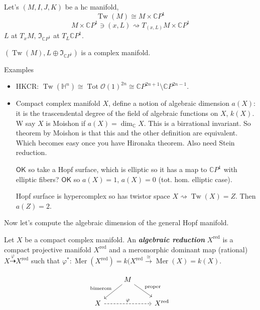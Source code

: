  \begin{defn}\leavevmode
	Let's $(M,I,J,K)$ be a hc manifold,
\[\operatorname{Tw}(M)\cong M\times \mathbb{C}P^{1}\]
\[M\times \mathbb{C}P^{1} \ni(x,L)\rightsquigarrow T_{(x,L)}M\times \mathbb{C}P^{1}\]
$L$ at  $T_xM$,  $\mathfrak{I}_{\mathbb{C}P^{1}}$ at $T_L\mathbb{C}P^{1}$.
\end{defn}


\begin{thm}\leavevmode
	$(\operatorname{Tw}(M),L\oplus \mathfrak{I}_{\mathbb{C}P^{1}})$ is a complex manifold.
\end{thm}

\begin{thing5}{Examples}\leavevmode
	\begin{itemize}
		\item HKCR: $\operatorname{Tw}(\mathbb{H}^n)\cong \operatorname{Tot}\mathcal{O}(1)^{2n}\cong \mathbb{C}P^{2n+1}\setminus \mathbb{C}P^{2n-1}$.
		\item Compact complex manifold $X$, define a notion of algebraic dimension $a(X)$: it is the trascendental degree of the field of algebraic functions on $X$,  $k(X)$. W say  $X$ is Moishon if $a(X)=\dim_\mathbb{C}X$. This is a birrational invariant. So theorem by Moishon is that this and the other definition are equivalent. Which  becomes easy once you have Hironaka theorem. Also need Stein reduction.

			$\mathsf{OK}$ so take a Hopf surface, which is elliptic so it has a map to $\mathbb{C}P^{1}$ with elliptic fibers? $\mathsf{OK}$ so $a(X)=1$,  $a(X)=0$ (tot. hom. elliptic case).

			\begin{thm}[Pontecorro]\leavevmode
				Hopf surface is hypercomplex so has twistor space $X\rightsquigarrow \operatorname{Tw}(X)=Z$. Then $a(Z)=2$.
			\end{thm}
	\end{itemize}
\end{thing5}

Now let's compute the algebraic dimension of the general Hopf manifold.

\begin{defn}\leavevmode
	Let $X$ be a compact complex manifold. An \textit{\textbf{algebraic reduction}} $X^{\operatorname{red}}$ is a compact projective manifold $X^{\operatorname{red}}$ and a meromorphic dominant map (rational) $X \overset{\varphi}{\dashrightarrow}X^{\operatorname{red}}$ such that $\varphi^* :\operatorname{Mer}(X^{\operatorname{red}})=k(X^{\operatorname{red}}\overset{\cong }{\longrightarrow}\operatorname{Mer}(X)=k(X)$.

	\[\begin{tikzcd}
	&M\arrow[dl,"\text{bimerom} ",swap]\arrow[dr,"\text{proper} "]\\
		X\arrow[rr,"\varphi",dashed]&&X^{\operatorname{red}}
	\end{tikzcd}\]
\end{defn}

